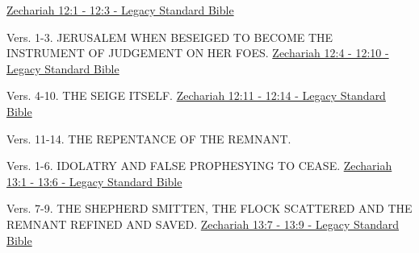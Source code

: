 \documentclass[
  ignorenonframetext,
]{beamer}
\begin{document}
\begin{frame}{12}
\label{section-145}
\href{https://read.lsbible.org/?q=zech12\%3A1-3}{Zechariah 12:1 - 12:3 -
Legacy Standard Bible}

\begin{block}{Vers. 1-3. JERUSALEM WHEN BESEIGED TO BECOME THE
INSTRUMENT OF JUDGEMENT ON HER FOES.}
\label{vers.-1-3.-jerusalem-when-beseiged-to-become-the-instrument-of-judgement-on-her-foes.}
\href{https://read.lsbible.org/?q=zech12\%3A4-10}{Zechariah 12:4 - 12:10
- Legacy Standard Bible}
\end{block}

\begin{block}{Vers. 4-10. THE SEIGE ITSELF.}
\label{vers.-4-10.-the-seige-itself.}
\href{https://read.lsbible.org/?q=zech12\%3A11-14}{Zechariah 12:11 -
12:14 - Legacy Standard Bible}
\end{block}

\begin{block}{Vers. 11-14. THE REPENTANCE OF THE REMNANT.}
\label{vers.-11-14.-the-repentance-of-the-remnant.}
\end{block}
\end{frame}

\begin{frame}{13}
\label{section-146}
\begin{block}{Vers. 1-6. IDOLATRY AND FALSE PROPHESYING TO CEASE.}
\label{vers.-1-6.-idolatry-and-false-prophesying-to-cease.}
\href{https://read.lsbible.org/?q=zech13\%3A1-6}{Zechariah 13:1 - 13:6 -
Legacy Standard Bible}
\end{block}

\begin{block}{Vers. 7-9. THE SHEPHERD SMITTEN, THE FLOCK SCATTERED AND
THE REMNANT REFINED AND SAVED.}
\label{vers.-7-9.-the-shepherd-smitten-the-flock-scattered-and-the-remnant-refined-and-saved.}
\href{https://read.lsbible.org/?q=zech13\%3A7-9}{Zechariah 13:7 - 13:9 -
Legacy Standard Bible}
\end{block}
\end{frame}
\end{document}

